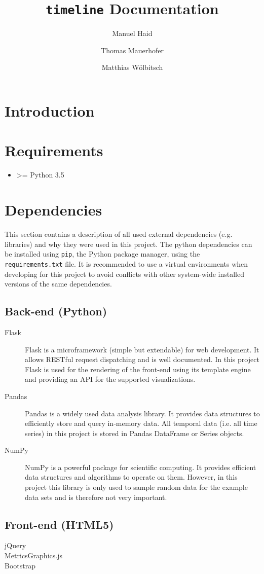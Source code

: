 \documentclass[11pt, a4paper]{article}
\author{Manuel Haid \and Thomas Mauerhofer \and Matthias Wölbitsch}
\title{\texttt{timeline} Documentation}
\begin{document}
\maketitle
\tableofcontents

\section{Introduction} \label{sec:intoduction}


\section{Requirements} \label{sec:requirments}

\begin{itemize}
 \item \textgreater= Python 3.5
\end{itemize}
 

\section{Dependencies} \label{sec:dependencies}

This section contains a description of all used external dependencies (e.g. libraries) and why they were used in this project.
The python dependencies can be installed using \texttt{pip}, the Python package manager, using the \texttt{requirements.txt} file. 
It is recommended to use a virtual environments when developing for this project to avoid conflicts with other system-wide installed versions of the same dependencies.


\subsection{Back-end (Python)}

\begin{description}
 \item[Flask] 
 Flask is a microframework (simple but extendable) for web development. 
 It allows RESTful request dispatching and is well documented. 
 In this project Flask is used for the rendering of the front-end using its template engine and providing an API for the supported visualizations.
 
 \item[Pandas] 
 Pandas is a widely used data analysis library. 
 It provides data structures to efficiently store and query in-memory data. 
 All temporal data (i.e. all time series) in this project is stored in Pandas DataFrame or Series objects. 
 
 \item[NumPy] 
 NumPy is a powerful package for scientific computing. 
 It provides efficient data structures and algorithms to operate on them. 
 However, in this project this library is only used to sample random data for the example data sets and is therefore not very important. 
\end{description}


\subsection{Front-end (HTML5)}

\begin{description}
 \item[jQuery]
 \item[MetricsGraphics.js]
 \item[Bootstrap]
\end{description}
\end{document}
